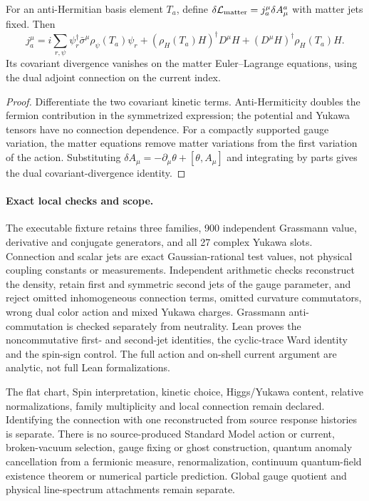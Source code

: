 \begin{proposition}
\label{prop:local-sm-jet-current}
For an anti-Hermitian basis element $T_a$, define
$\delta\mathcal L_{\rm matter}=j_a^\mu\delta A_\mu^a$ with matter jets
fixed. Then
\begin{equation}
 j_a^\mu=i\sum_{r,\psi}\psi_r^\dagger\bar\sigma^\mu\rho_\psi(T_a)\psi_r
   +(\rho_H(T_a)H)^\dagger D^\mu H
   +(D^\mu H)^\dagger\rho_H(T_a)H .
 \label{eq:local-sm-matter-current}
\end{equation}
Its covariant divergence vanishes on the matter Euler--Lagrange equations,
using the dual adjoint connection on the current index.
\end{proposition}
\begin{proof}
Differentiate the two covariant kinetic terms. Anti-Hermiticity doubles
the fermion contribution in the symmetrized expression; the potential and
Yukawa tensors have no connection dependence. For a compactly supported
gauge variation, the matter equations remove matter variations from the
first variation of the action. Substituting
$\delta A_\mu=-\partial_\mu\theta+[\theta,A_\mu]$ and integrating by parts
gives the dual covariant-divergence identity.
\end{proof}

\paragraph{Exact local checks and scope.}
The executable fixture retains three families, 900 independent Grassmann
value, derivative and conjugate generators, and all 27 complex Yukawa
slots. Connection and scalar jets are exact Gaussian-rational test values,
not physical coupling constants or measurements. Independent arithmetic
checks reconstruct the density, retain first and symmetric second jets
of the gauge parameter, and reject omitted inhomogeneous connection
terms, omitted curvature commutators, wrong dual color action and mixed
Yukawa charges. Grassmann anti-commutation is checked separately from
neutrality. Lean proves the noncommutative first- and second-jet identities,
the cyclic-trace Ward identity and the spin-sign control. The full action
and on-shell current argument are analytic, not full Lean formalizations.

The flat chart, Spin interpretation, kinetic choice, Higgs/Yukawa content,
relative normalizations, family multiplicity and local connection remain
declared. Identifying the connection with one reconstructed from source
response histories is separate. There is no source-produced Standard Model
action or current, broken-vacuum selection, gauge fixing or ghost
construction, quantum anomaly cancellation from a fermionic measure,
renormalization, continuum quantum-field existence theorem or numerical
particle prediction. Global gauge quotient and physical line-spectrum
attachments remain separate.
